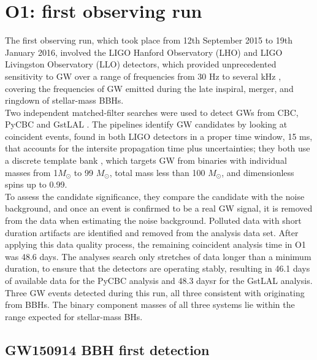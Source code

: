 \documentclass[binding=0.6cm, LaM]{sapthesis}
\begin{document}
\section{O1: first observing run}

	The first observing run, which took place from 12th September 2015 to 19th January 2016, 
	involved the LIGO Hanford Observatory (LHO) and LIGO Livingston Observatory (LLO) detectors, which provided unprecedented sensitivity to GW 
	over a range of frequencies from 30 Hz to several kHz \cite{14}, 
	covering the frequencies of GW emitted during 
	the late inspiral, merger, and ringdown of stellar-mass BBHs. \\
	Two independent matched-filter searches were used to detect GWs from CBC, PyCBC \cite{109-112} and GstLAL \cite{112-114}.
	The pipelines identify GW candidates by looking at coincident events, 
	found in both LIGO detectors in a proper time window, 15 ms, 
	that accounts for the intersite propagation time plus uncertainties; 
	they both use a discrete template bank \cite{42, 114, 115, 117-120}, which targets GW from binaries with individual masses from 1${M_\odot}$  to 99 ${M_\odot}$,
	total mass less than 100 ${M_\odot}$, and dimensionless spins up to 0.99.\\
	To assess the candidate significance, they compare the candidate with the noise background, 
	and once an event is confirmed to be a real GW signal, it is removed from the data when estimating the noise background.
	Polluted data with short duration artifacts are identified and removed from the analysis data set.
	After applying this data quality process, the remaining coincident analysis time in O1 was 48.6 days. 
	The analyses search only stretches of data longer than a minimum duration, 
	to ensure that the detectors are operating stably, 
	resulting in 46.1 days of available data for the PyCBC analysis and 48.3 daysr for the GstLAL analysis. \\
	Three GW events detected during this run, all three consistent with originating from BBHs.
	The binary component masses of all three systems lie 
	within the range expected for stellar-mass BHs. 

\subsection{GW150914 BBH first detection}
	
\end{document}
